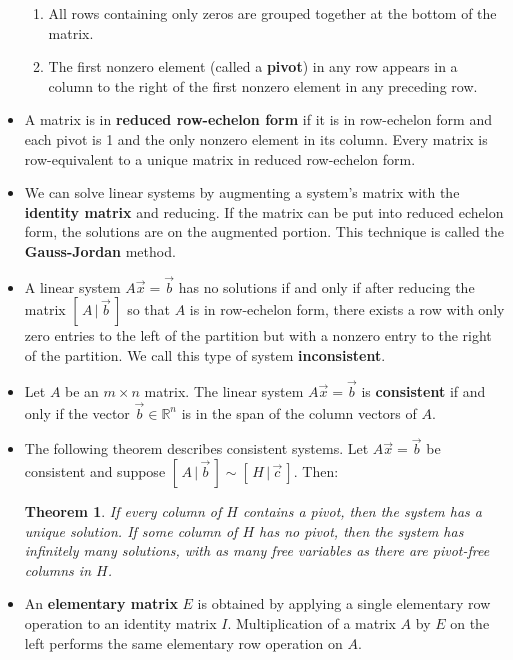 \documentclass[11pt]{amsart}
\newcommand{\reals}{\mathbb{R}}
\newtheorem{theorem}{Theorem}[section]
\begin{document}
\begin{itemize}
{\begin{enumerate}
			\item{All rows containing only zeros are grouped together at the bottom of the matrix.}
			\item{The first nonzero element (called a \textbf{pivot}) in any row appears in a column to the right of the first nonzero element
			in any preceding row.}
		\end{enumerate}
	}
	\item{
		A matrix is in \textbf{reduced row-echelon form} if it is in row-echelon form and each pivot is 1 and the only nonzero element in its
		column. Every matrix is row-equivalent to a unique matrix in reduced row-echelon form.
	}
	\item{
		We can solve linear systems by augmenting a system's matrix with the \textbf{identity matrix} and reducing. If the matrix can be
		put into reduced echelon form, the solutions are on the augmented portion. This technique is called the \textbf{Gauss-Jordan} method.
	}
	\item{
		A linear system $A\vec{x} = \vec{b}$ has no solutions if and only if after reducing the matrix $[\, A \, | \, \vec{b} \, ]$ so that $A$ is in
		row-echelon form, there exists a row with only zero entries to the left of the partition but with a nonzero entry to the right of the
		partition. We call this type of system \textbf{inconsistent}.
	}
	\item{
		Let $A$ be an $m \times n$ matrix. The linear system $A\vec{x} = \vec{b}$ is \textbf{consistent} if and only if the vector 
		$\vec{b} \in \reals^n$ is in the span of the column vectors of $A$.
	}
	\item{
		The following theorem describes consistent systems. Let $A\vec{x} = \vec{b}$ be consistent and suppose 
		$[\, A \, | \, \vec{b} \, ] \sim [\, H \, | \, \vec{c} \, ]$. Then:
		\begin{theorem}
			If every column of $H$ contains a pivot, then the system has a unique solution. If some column of $H$ has no pivot, then the 
			system has infinitely many solutions, with as many free variables as there are pivot-free columns in $H$.
		\end{theorem}
	}
	\item{
		An \textbf{elementary matrix} $E$ is obtained by applying a single elementary row operation to an identity matrix $I$. Multiplication of
		a matrix $A$ by $E$ on the left performs the same elementary row operation on $A$.
	}
\end{itemize}
\end{document}

